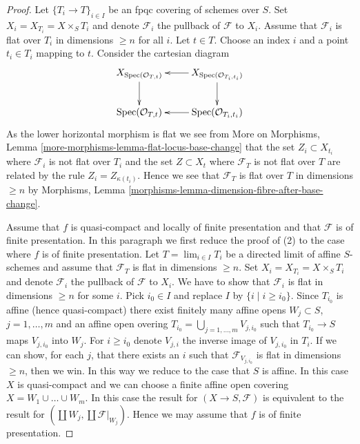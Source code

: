 \documentclass[10pt,a4paper]{amsart}
\theoremstyle{plain}
\theoremstyle{definition}
\theoremstyle{remark}
\numberwithin{equation}{subsection}
\def\lim{\mathop{\mathrm{lim}}\nolimits}
\def\Spec{\mathop{\mathrm{Spec}}}
\begin{document}
\begin{proof}
Let $\{T_i \to T\}_{i \in I}$ be an fpqc covering of schemes over $S$.
Set $X_i = X_{T_i} = X \times_S T_i$ and denote $\mathcal{F}_i$ the
pullback of $\mathcal{F}$ to $X_i$. Assume that $\mathcal{F}_i$
is flat over $T_i$ in dimensions $\geq n$ for all $i$. Let $t \in T$.
Choose an index $i$ and a point $t_i \in T_i$ mapping to $t$.
Consider the cartesian diagram
$$
\xymatrix{
X_{\Spec(\mathcal{O}_{T, t})} \ar[d] &
X_{\Spec(\mathcal{O}_{T_i, t_i})} \ar[d] \ar[l] \\
\Spec(\mathcal{O}_{T, t}) &
\Spec(\mathcal{O}_{T_i, t_i}) \ar[l]
}
$$
As the lower horizontal morphism is flat we see from
More on Morphisms, Lemma \ref{more-morphisms-lemma-flat-locus-base-change}
that the set $Z_i \subset X_{t_i}$ where $\mathcal{F}_i$ is not flat
over $T_i$ and the set $Z \subset X_t$ where $\mathcal{F}_T$ is not flat
over $T$ are related by the rule $Z_i = Z_{\kappa(t_i)}$. Hence we see
that $\mathcal{F}_T$ is flat over $T$ in dimensions $\geq n$ by
Morphisms, Lemma \ref{morphisms-lemma-dimension-fibre-after-base-change}.

\medskip\noindent
Assume that $f$ is quasi-compact and locally of finite presentation and
that $\mathcal{F}$ is of finite presentation.
In this paragraph we first reduce the proof of (2) to the case where
$f$ is of finite presentation.
Let $T = \lim_{i \in I} T_i$ be a directed limit of
affine $S$-schemes and assume that $\mathcal{F}_T$ is flat in dimensions
$\geq n$. Set $X_i = X_{T_i} = X \times_S T_i$ and denote $\mathcal{F}_i$
the pullback of $\mathcal{F}$ to $X_i$. We have to show that
$\mathcal{F}_i$ is flat in dimensions $\geq n$ for some $i$.
Pick $i_0 \in I$ and replace $I$ by $\{i \mid i \geq i_0\}$.
Since $T_{i_0}$ is affine (hence quasi-compact) there exist finitely
many affine opens $W_j \subset S$, $j = 1, \ldots, m$ and an affine open
overing $T_{i_0} = \bigcup_{j = 1, \ldots, m} V_{j, i_0}$
such that $T_{i_0} \to S$ maps $V_{j, i_0}$ into $W_j$.
For $i \geq i_0$ denote $V_{j, i}$ the inverse image of $V_{j, i_0}$
in $T_i$. If we can show, for each $j$, that there exists an $i$ such that
$\mathcal{F}_{V_{j, i_0}}$ is flat in dimensions $\geq n$, then
we win. In this way we reduce to the case that $S$ is affine.
In this case $X$ is quasi-compact and we can choose a finite
affine open covering $X = W_1 \cup \ldots \cup W_m$. In this case
the result for $(X \to S, \mathcal{F})$ is equivalent to the result for
$(\coprod W_j, \coprod \mathcal{F}|_{W_j})$. Hence we may assume that
$f$ is of finite presentation.


\end{proof}
\end{document}
